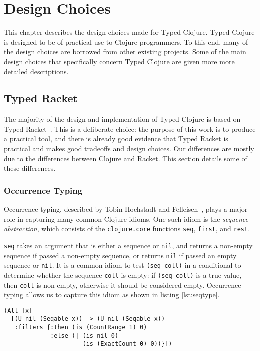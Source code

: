 \chapter{Design Choices}

This chapter describes the design choices made for Typed Clojure.
Typed Clojure is designed to be of practical use to Clojure programmers.
To this end, many of the design choices are borrowed from other existing projects.
Some of the main design choices that specifically concern Typed Clojure are given more
more detailed descriptions.

\section{Typed Racket}

The majority of the design and implementation of Typed Clojure is based on Typed Racket~\cite{Tob10}.
This is a deliberate choice: the purpose of this work is to produce
a practical tool, and there is already good evidence that Typed Racket
is practical and makes good tradeoffs and design choices.
Our differences are mostly due to the differences between Clojure and Racket.
This section details some of these differences.

\subsection{Occurrence Typing}

Occurrence typing, described by Tobin-Hochstadt and Felleisen~\cite{TF10},
plays a major role in capturing many common Clojure idioms.
One such idiom is the \emph{sequence abstraction}, which
consists of the \lstinline|clojure.core| functions \lstinline|seq|, \lstinline|first|, and \lstinline|rest|.

\lstinline|seq| takes an argument that is either a sequence or \lstinline|nil|,
and returns a non-empty sequence if passed a non-empty sequence, or returns
\lstinline|nil| if passed an empty sequence or \lstinline|nil|.
It is a common idiom to test \lstinline|(seq coll)| in a conditional
to determine whether the sequence \lstinline|coll| is empty:
if \lstinline|(seq coll)| is a true value, then \lstinline|coll|
is non-empty, otherwise it should be considered empty.
Occurrence typing allows us to capture this idiom as shown in
listing \ref{lst:seqtype}.

\begin{lstlisting}[caption=Type assiciated with clojure.core/seq, label=lst:seqtype]
(All [x]
  [(U nil (Seqable x)) -> (U nil (Seqable x))
   :filters {:then (is (CountRange 1) 0)
             :else (| (is nil 0)
                      (is (ExactCount 0) 0))}])
\end{lstlisting}

